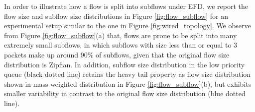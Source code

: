 \documentclass[preprint,12pt]{elsarticle}
\begin{document}

In order to illustrate how a flow is split into subflows under EFD, we report the flow size and subflow size distributions in Figure \ref{fig:flow_subflow}  for an experimental setup similar to the one in Figure \ref{fig:wired_topology}.  %
We observe from Figure \ref{fig:flow_subflow}(a) that, flows are prone to be split into many extremely small subflows, in which subflows with size less than or equal to 3 packets make up around 90\% of subflows, given that the original flow size distribution is Zipfian. In addition, subflow size distribution in the low priority queue (black dotted line) retains the heavy tail property as flow size distribution shown in mass-weighted distribution in Figure \ref{fig:flow_subflow}(b), but exhibits smaller variability in contrast to the original flow size distribution (blue dotted line). 
\end{document}

